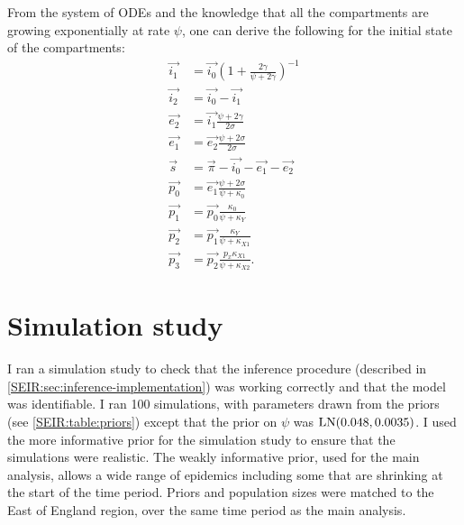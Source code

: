 \documentclass[thesis.tex]{subfiles}
\begin{document}
From the system of ODEs and the knowledge that all the compartments are growing exponentially at rate $\psi$, one can derive the following for the initial state of the compartments:
\begin{align}
    \vec{i_1} &= \vec{i_0} \left(1 + \frac{2\gamma}{\psi + 2\gamma} \right)^{-1} \\
    \vec{i_2} &= \vec{i_0} - \vec{i_1} \\
    \vec{e_2} &= \vec{i_1} \frac{\psi + 2\gamma}{2\sigma} \\
    \vec{e_1} &= \vec{e_2} \frac{\psi + 2\sigma}{2\sigma} \\
    \vec{s} &= \vec{\pi} - \vec{i_0} - \vec{e_1} - \vec{e_2} \\
    \vec{p_0} &= \vec{e_1} \frac{\psi + 2\sigma}{\psi + \kappa_0} \\
    \vec{p_1} &= \vec{p_0} \frac{\kappa_0}{\psi + \kappa_Y} \\
    \vec{p_2} &= \vec{p_1} \frac{\kappa_Y}{\psi + \kappa_{X1}} \\
    \vec{p_3} &= \vec{p_2} \frac{p_x \kappa_{X1}}{\psi + \kappa_{X2}}.
\end{align}

\section{Simulation study} \label{SEIR:sec:sim-study}

I ran a simulation study to check that the inference procedure (described in \cref{SEIR:sec:inference-implementation}) was working correctly and that the model was identifiable.
I ran 100 simulations, with parameters drawn from the priors (see \cref{SEIR:table:priors}) except that the prior on $\psi$ was $\operatorname{LN}(0.048, 0.0035)$.
I used the more informative prior for the simulation study to ensure that the simulations were realistic.
The weakly informative prior, used for the main analysis, allows a wide range of epidemics including some that are shrinking at the start of the time period.
Priors and population sizes were matched to the East of England region, over the same time period as the main analysis.
\end{document}
